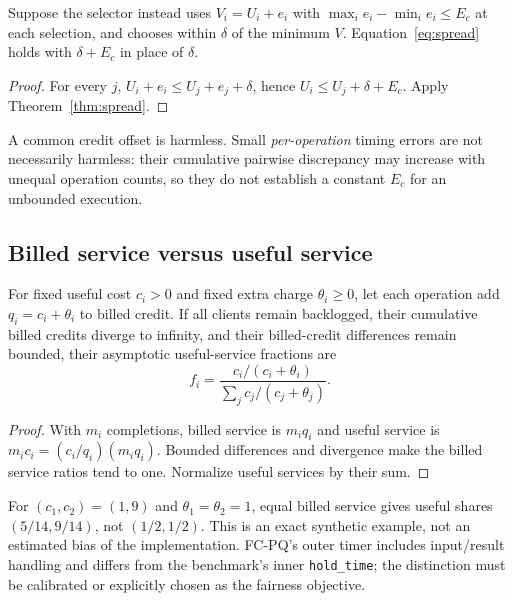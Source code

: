 \begin{corollary}
\label{cor:error}
Suppose the selector instead uses $V_i=U_i+e_i$ with
$\max_i e_i-\min_i e_i\le E_c$ at each selection, and chooses within $\delta$
of the minimum $V$. Equation~\eqref{eq:spread} holds with $\delta+E_c$ in
place of $\delta$.
\end{corollary}
\begin{proof}
For every $j$, $U_i+e_i\le U_j+e_j+\delta$, hence
$U_i\le U_j+\delta+E_c$. Apply Theorem~\ref{thm:spread}.
\end{proof}
A common credit offset is harmless. Small \emph{per-operation} timing errors
are not necessarily harmless: their cumulative pairwise discrepancy may
increase with unequal operation counts, so they do not establish a constant
$E_c$ for an unbounded execution.

\subsection{Billed service versus useful service}
\begin{proposition}
\label{prop:bias}
For fixed useful cost $c_i>0$ and fixed extra charge $\theta_i\ge0$, let each
operation add $q_i=c_i+\theta_i$ to billed credit. If all clients remain
backlogged, their cumulative billed credits diverge to infinity, and their
billed-credit differences remain bounded, their asymptotic useful-service
fractions are
\begin{equation}
 f_i=\frac{c_i/(c_i+\theta_i)}{\sum_j c_j/(c_j+\theta_j)}.\label{eq:bias}
\end{equation}
\end{proposition}
\begin{proof}
With $m_i$ completions, billed service is $m_iq_i$ and useful service is
$m_ic_i=(c_i/q_i)(m_iq_i)$. Bounded differences and divergence make the billed
service ratios tend to one. Normalize useful services by their sum.
\end{proof}
For $(c_1,c_2)=(1,9)$ and $\theta_1=\theta_2=1$, equal billed service gives
useful shares $(5/14,9/14)$, not $(1/2,1/2)$. This is an exact synthetic
example, not an estimated bias of the implementation. FC-PQ's outer timer
includes input/result handling and differs from the benchmark's inner
\texttt{hold\_time}; the distinction must be calibrated or explicitly chosen
as the fairness objective.

